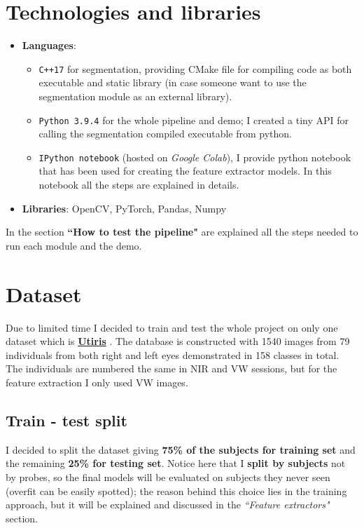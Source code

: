 \documentclass{article}
\begin{document}
\section{Technologies and libraries}
\begin{itemize}
    \item \textbf{Languages}: 
    \begin{itemize}
        \item \texttt{C++17} for segmentation, providing CMake file for compiling code as both executable and static library (in case someone want to use the segmentation module as an external library).
        \item \texttt{Python 3.9.4} for the whole pipeline and demo; I created a tiny API for calling the segmentation compiled executable from python.
        \item \texttt{IPython notebook} (hosted on \textit{Google Colab}), I provide python notebook that has been used for creating the feature extractor models. In this notebook all the steps are explained in details.
    \end{itemize}
    \item \textbf{Libraries}: OpenCV, PyTorch, Pandas, Numpy
\end{itemize}

In the section \textbf{``How to test the pipeline"} are explained all the steps needed to run each module and the demo.

\section{Dataset}
Due to limited time I decided to train and test the whole project on only one dataset which is
\href{https://utiris.wordpress.com/}{\textbf{Utiris}} \cite{HosseiniAraabiSoltanianZadeh:2010}. The database is constructed with 1540 images from 79 individuals from both right and left eyes demonstrated in 158 classes in total. The individuals are numbered the same in NIR and VW sessions, but for the feature extraction I only used VW images.

\subsection{Train - test split}
I decided to split the dataset giving \textbf{75\% of the subjects for training set} and the remaining \textbf{25\% for testing set}. Notice here that I \textbf{split by subjects} not by probes, so the final models will be evaluated on subjects they never seen (overfit can be easily spotted); the reason behind this choice lies in the training approach, but it will be explained and discussed in the \textit{``Feature extractors"} section.
\end{document}
